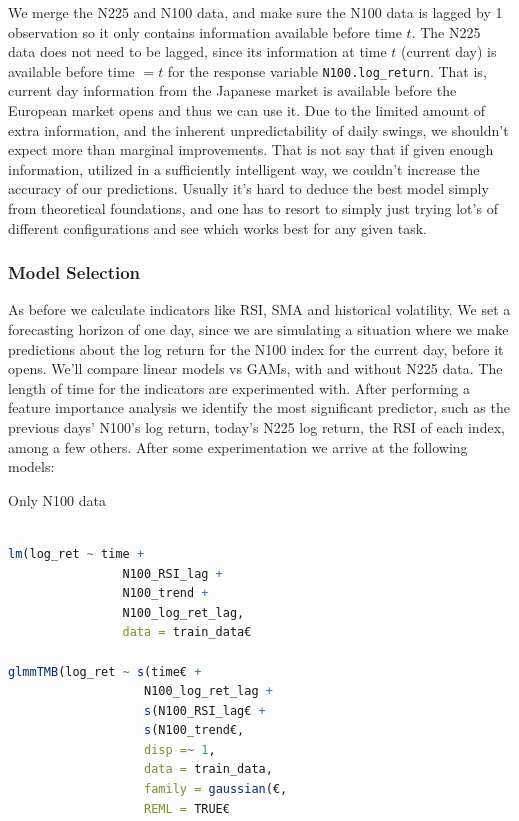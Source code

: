 \documentclass[12pt, twoside,hidelinks]{article}
\theoremstyle{definition}
\numberwithin{equation}{section}
\begin{document}
We merge the N225 and N100 data, and make sure the N100 data is lagged by 1 observation so it only contains information available before time $t$. The N225 data does not need to be lagged, since its information at time $t$ (current day) is available before time $= t$ for the response variable \texttt{N100.log\_return}. That is, current day information from the Japanese market is available before the European market opens and thus we can use it. Due to the limited amount of extra information, and the inherent unpredictability of daily swings, we shouldn't expect more than marginal improvements. That is not say that if given enough information, utilized in a sufficiently intelligent way, we couldn't increase the accuracy of our predictions. Usually it's hard to deduce the best model simply from theoretical foundations, and one has to resort to simply just trying lot's of different configurations and see which works best for any given task.

\subsubsection{Model Selection}

As before we calculate indicators like RSI, SMA and historical volatility. We set a forecasting horizon of one day, since we are simulating a situation where we make predictions about the log return for the N100 index for the current day, before it opens. We'll compare linear models vs GAMs, with and without N225 data. The length of time for the indicators are experimented with. After performing a feature importance analysis we identify the most significant predictor, such as the previous days' N100's log return, today's N225 log return, the RSI of each index, among a few others. After some experimentation we arrive at the following models:
\newline

Only N100 data 
\begin{lstlisting}[language=R]

lm(log_ret ~ time + 
                N100_RSI_lag + 
                N100_trend +
                N100_log_ret_lag,
                data = train_data€

glmmTMB(log_ret ~ s(time€ +
                   N100_log_ret_lag + 
                   s(N100_RSI_lag€ + 
                   s(N100_trend€,
                   disp =~ 1,
                   data = train_data,
                   family = gaussian(€, 
                   REML = TRUE€
\end{lstlisting}
\end{document}

